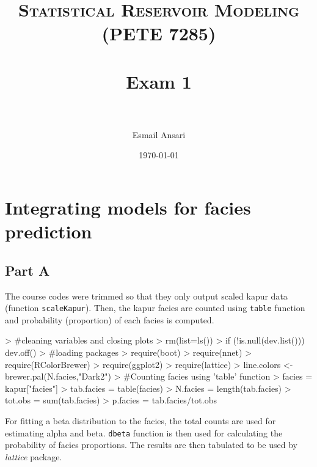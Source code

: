 \documentclass[paper=a4, fontsize=12pt]{scrartcl} %
\title{	
\normalfont \normalsize 
\textsc{Statistical Reservoir Modeling \\
(PETE 7285)} \\ [25pt] %
\horrule{0.5pt} \\[0.4cm] %
\huge  Exam 1 \\ %
\horrule{2pt} \\[0.5cm] %
}
\author{Esmail Ansari} %
\date{\small\today} %
\numberwithin{equation}{section} %
\numberwithin{figure}{section} %
\numberwithin{table}{section} %
\begin{document}


\maketitle %


\section{Integrating models for facies prediction}

\subsection{Part A}
The course codes were trimmed so that they only output scaled kapur data (function \texttt{scaleKapur}). Then, the kapur facies are counted using \texttt{table} function and probability (proportion) of each facies is computed. 

\begin{Schunk}
\begin{Sinput}
> #cleaning variables and closing plots
> rm(list=ls())
> if (!is.null(dev.list())) dev.off()
> #loading packages
> require(boot)
> require(nnet)
> require(RColorBrewer)
> require(ggplot2)
> require(lattice)
> line.colors <- brewer.pal(N.facies,"Dark2")
> #Counting facies using 'table' function
> facies     = kapur["facies"]
> tab.facies = table(facies)
> N.facies   = length(tab.facies)
> tot.obs    = sum(tab.facies)
> p.facies   = tab.facies/tot.obs
\end{Sinput}
\end{Schunk}

For fitting a beta distribution to the facies, the total counts are used for estimating alpha and beta. \texttt{dbeta} function is then used for calculating the probability of facies proportions. The results are then tabulated to be used by \textit{lattice} package. 
\end{document}
